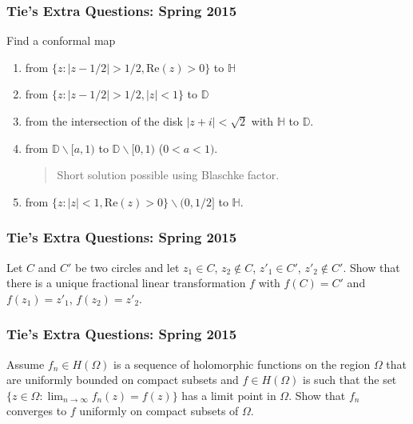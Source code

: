 \hypertarget{ties-extra-questions-spring-2015-19}{%
\subsubsection{Tie's Extra Questions: Spring
2015}\label{ties-extra-questions-spring-2015-19}}

Find a conformal map

\begin{enumerate}
\def\labelenumi{\arabic{enumi}.}
\item
  from \(\{ z: |z - 1/2| > 1/2, \text{Re}(z)>0 \}\) to \(\mathbb H\)
\item
  from \(\{ z: |z - 1/2| > 1/2, |z| <1 \}\) to \(\mathbb D\)
\item
  from the intersection of the disk \(|z + i| < \sqrt{2}\) with
  \({\mathbb H}\) to \({\mathbb D}\).
\item
  from \({\mathbb D} \backslash [a, 1)\) to
  \({\mathbb D} \backslash [0, 1)\) (\(0<a<1)\).

  \begin{quote}
  Short solution possible using Blaschke factor.
  \end{quote}
\item
  from \(\{ z: |z| < 1, \text{Re}(z) > 0 \} \backslash (0, 1/2]\) to
  \(\mathbb H\).
\end{enumerate}

\hypertarget{ties-extra-questions-spring-2015-20}{%
\subsubsection{Tie's Extra Questions: Spring
2015}\label{ties-extra-questions-spring-2015-20}}

Let \(C\) and \(C'\) be two circles and let \(z_1 \in C\),
\(z_2 \notin C\), \(z'_1 \in C'\), \(z'_2 \notin C'\). Show that there
is a unique fractional linear transformation \(f\) with \(f(C) = C'\)
and \(f(z_1) = z'_1\), \(f(z_2) = z'_2\).

\hypertarget{ties-extra-questions-spring-2015-21}{%
\subsubsection{Tie's Extra Questions: Spring
2015}\label{ties-extra-questions-spring-2015-21}}

Assume \(f_n \in H(\Omega)\) is a sequence of holomorphic functions on
the region \(\Omega\) that are uniformly bounded on compact subsets and
\(f \in H(\Omega)\) is such that the set
\(\displaystyle \{z \in \Omega: \lim_{n \rightarrow \infty} f_n(z) = f(z) \}\)
has a limit point in \(\Omega\). Show that \(f_n\) converges to \(f\)
uniformly on compact subsets of \(\Omega\).

